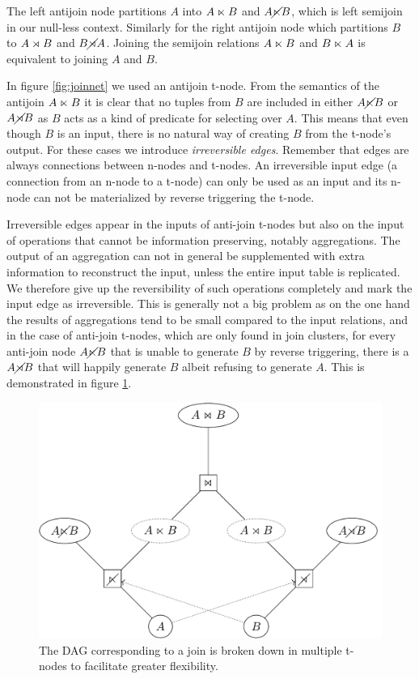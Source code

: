 The left antijoin node partitions \(A\) into \(A \ltimes B\) and
\(A \cancel\ltimes B\), which is left semijoin in our null-less
context. Similarly for the right antijoin node which partitions \(B\)
to \(A \rtimes B\) and \(B \cancel\rtimes A\). Joining the semijoin relations
\(A \ltimes B\) and \(B \ltimes A\) is equivalent to joining \(A\) and
\(B\).

In figure \ref{fig:joinnet} we used an antijoin t-node. From the
semantics of the antijoin \(A \ltimes B\) it is clear that no tuples
from \(B\) are included in either \(A \cancel\ltimes B\) or \(A \cancel\rtimes B\)
as \(B\) acts as a kind of predicate for selecting over \(A\). This
means that even though \(B\) is an input, there is no natural
way of creating \(B\) from the t-node's output. For these cases we
introduce \emph{irreversible edges}. Remember that edges are always connections
between n-nodes and t-nodes. An irreversible input edge (a connection
from an n-node to a t-node) can only be used as an input and its n-node
can not be materialized by reverse triggering the t-node.

Irreversible edges appear in the inputs of anti-join t-nodes but also
on the input of operations that cannot be information preserving,
notably aggregations. The output of an aggregation can not in general
be supplemented with extra information to reconstruct the input,
unless the entire input table is replicated. We therefore give up the
reversibility of such operations completely and mark the input edge
as irreversible. This is generally not a big problem as on the one
hand the results of aggregations tend to be small compared to the
input relations, and in the case of anti-join t-nodes, which are only
found in join clusters, for every anti-join node \(A \cancel\ltimes B\) that
is unable to generate \(B\) by reverse triggering, there is a \(A
\cancel\rtimes B\) that will happily generate \(B\) albeit refusing to
generate \(A\). This is demonstrated in figure \ref{fig:joinnetdir}.

\begin{figure}[H]
  \centering
  \includegraphics[width=.9\linewidth]{./imgs/joinnetdir.pdf}
  \caption{\label{fig:joinnetdir}The DAG corresponding to a join is
    broken down in multiple t-nodes to facilitate greater
    flexibility.}
\end{figure}

